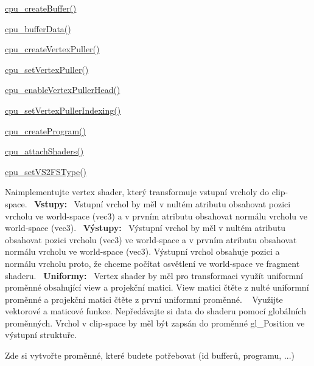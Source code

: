 \begin{DoxyRefList}
\begin{DoxyItemize}
\item \hyperlink{cpu_8c_a94245836b857a36f392bf86087e8e776}{cpu\+\_\+create\+Buffer()}
\item \hyperlink{cpu_8c_aee5c818b862ef2e411f121fbdfb1c634}{cpu\+\_\+buffer\+Data()}
\item \hyperlink{cpu_8c_a3ec68476772605b8be33329f88ae4d97}{cpu\+\_\+create\+Vertex\+Puller()}
\item \hyperlink{cpu_8c_a4cb243dfeb6443e0f9a6110ce1dd27eb}{cpu\+\_\+set\+Vertex\+Puller()}
\item \hyperlink{cpu_8c_a5a6ce215f054d26134c7598714cfb453}{cpu\+\_\+enable\+Vertex\+Puller\+Head()}
\item \hyperlink{cpu_8c_a4159dbbc604685e544bc296708ced5f9}{cpu\+\_\+set\+Vertex\+Puller\+Indexing()}
\item \hyperlink{cpu_8c_af3da8b71aea1c26e6a90af7da9d0e85c}{cpu\+\_\+create\+Program()}
\item \hyperlink{cpu_8c_a76c50b0e120265198fe036abdc42d271}{cpu\+\_\+attach\+Shaders()}
\item \hyperlink{cpu_8c_ae9a0898c1ebe8d914d0858f56028c591}{cpu\+\_\+set\+V\+S2\+F\+S\+Type()}  
\end{DoxyItemize}
\item[\label{todo__todo000002}%
\Hypertarget{todo__todo000002}%
Global \hyperlink{group__shader__side_gaed1d11e6e120b6a6513075c2e2c7ab19}{phong\+\_\+\+VS} (\hyperlink{structGPUVertexShaderData}{G\+P\+U\+Vertex\+Shader\+Data} $\ast$const data)]Naimplementujte vertex shader, který transformuje vstupní vrcholy do clip-\/space.~\newline
 {\bfseries Vstupy\+:}~\newline
 Vstupní vrchol by měl v nultém atributu obsahovat pozici vrcholu ve world-\/space (vec3) a v prvním atributu obsahovat normálu vrcholu ve world-\/space (vec3).~\newline
 {\bfseries Výstupy\+:}~\newline
 Výstupní vrchol by měl v nultém atributu obsahovat pozici vrcholu (vec3) ve world-\/space a v prvním atributu obsahovat normálu vrcholu ve world-\/space (vec3). Výstupní vrchol obsahuje pozici a normálu vrcholu proto, že chceme počítat osvětlení ve world-\/space ve fragment shaderu.~\newline
 {\bfseries Uniformy\+:}~\newline
 Vertex shader by měl pro transformaci využít uniformní proměnné obsahující view a projekční matici. View matici čtěte z nulté uniformní proměnné a projekční matici čtěte z první uniformní proměnné. ~\newline
 Využijte vektorové a maticové funkce. Nepředávajte si data do shaderu pomocí globálních proměnných. Vrchol v clip-\/space by měl být zapsán do proměnné gl\+\_\+\+Position ve výstupní struktuře.  
\item[\label{todo__todo000007}%
\Hypertarget{todo__todo000007}%
Global \hyperlink{structPhongData_abe8d787c8d298a58614c7d98dbf43a91}{Phong\+Data\+:\+:prg} ]Zde si vytvořte proměnné, které budete potřebovat (id bufferů, programu, ...) 
\end{DoxyRefList}